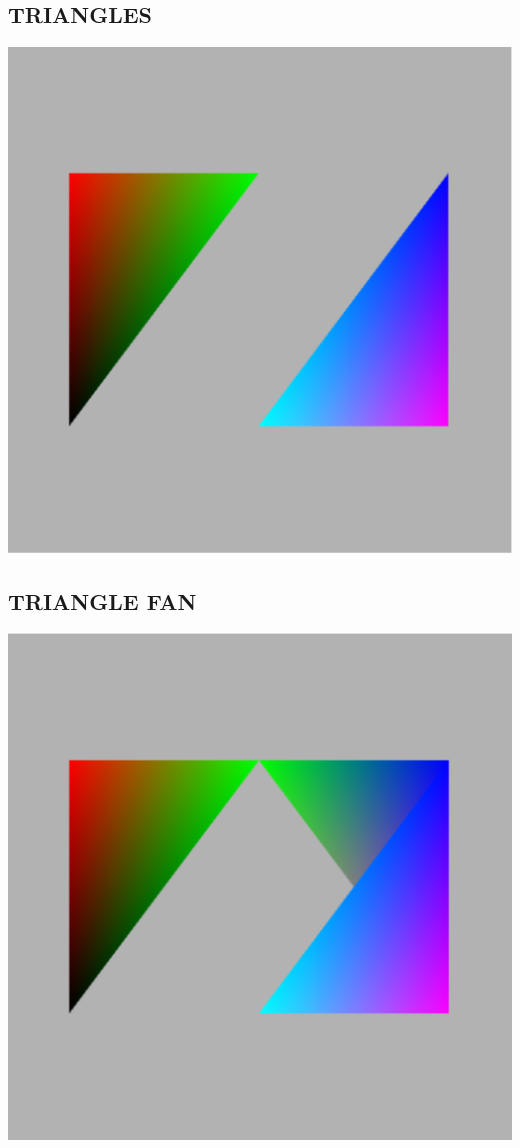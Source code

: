 \documentclass{report}
\begin{document}
\subsection{TRIANGLES}
\includegraphics[width=1.0\textwidth]{Image_5}
\subsection{TRIANGLE FAN}
\includegraphics[width=1.0\textwidth]{Image_6}
\end{document}

